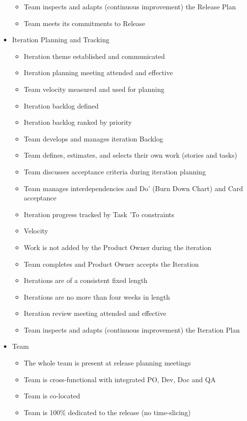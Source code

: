 \begin{appendices}
\begin{itemize}
\begin{itemize}
			\item Team inspects and adapts (continuous improvement) the Release Plan
			\item Team meets its commitments to Release
		\end{itemize}
	\item Iteration Planning and Tracking
		\begin{itemize}
			\item Iteration theme established and communicated
			\item Iteration planning meeting attended and effective
			\item Team velocity measured and used for planning
			\item Iteration backlog defined
			\item Iteration backlog ranked by priority
			\item Team develops and manages iteration Backlog
			\item Team defines, estimates, and selects their own work (stories and tasks)
			\item Team discusses acceptance criteria during iteration planning
			\item Team manages interdependencies and Do' (Burn Down Chart) and Card acceptance
			\item Iteration progress tracked by Task 'To constraints
			\item Velocity
			\item Work is not added by the Product Owner during the iteration
			\item Team completes and Product Owner accepts the Iteration 
			\item Iterations are of a consistent fixed length
			\item Iterations are no more than four weeks in length
			\item Iteration review meeting attended and effective
			\item Team inspects and adapts (continuous improvement) the Iteration Plan
		\end{itemize}
	\item Team
		\begin{itemize}
			\item The whole team is present at release planning meetings
			\item Team is cross-functional with integrated PO, Dev, Doc and QA
			\item Team is co-located
			\item Team is 100\% dedicated to the release (no time-slicing)

\end{itemize}
\end{itemize}
\end{appendices}
